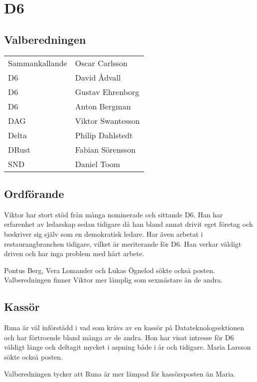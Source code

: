 \section{D6}

\subsection{Valberedningen}
\begin{autoframe}

\begin{tabular}{ll}
Sammankallande & Oscar Carlsson \\
D6 & David Ådvall \\
D6 & Gustav Ehrenborg \\
D6 & Anton Bergman \\
DAG  & Viktor Swantesson \\
Delta  & Philip Dahlstedt \\
DRust & Fabian Sörensson \\
SND  & Daniel Toom
\end{tabular}

\end{autoframe}



\subsection{Ordförande}
\begin{autoframe}
Viktor har stort stöd från många nominerade och sittande D6. Han har erfarenhet av ledarskap
sedan tidigare då han bland annat drivit eget företag och beskriver sig själv som en demokratisk
ledare. Har även arbetat i restaurangbranchen tidigare, vilket är meriterande för D6.
Han verkar väldigt driven och har inga problem med hårt arbete.

\bigskip
Pontus Berg, Vera Lomander och Lukas Ögnelod sökte också posten. Valberedningen finner
Viktor mer lämplig som sexmästare än de andra.
\end{autoframe}

\subsection{Kassör}
\begin{autoframe}
Runa är väl införstådd i vad som krävs av en kassör på Datateknologsektionen och har
förtroende bland många av de andra. Hon har visat intresse för D6 väldigt länge och deltagit
mycket i aspning både i år och tidigare.
Maria Larsson sökte också posten.

\bigskip
Valberedningen tycker att Runa är mer lämpad för
kassörsposten än Maria.
\end{autoframe}

